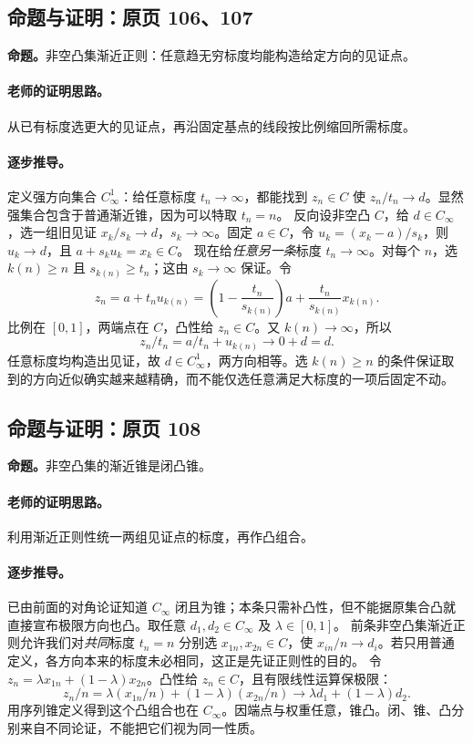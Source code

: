\subsection{命题与证明：原页 106、107}

\textbf{命题。}非空凸集渐近正则：任意趋无穷标度均能构造给定方向的见证点。

\paragraph{老师的证明思路。}从已有标度选更大的见证点，再沿固定基点的线段按比例缩回所需标度。

\paragraph{逐步推导。}
定义强方向集合 $C^1_\infty$：给任意标度 $t_n\to\infty$，都能找到 $z_n\in C$ 使 $z_n/t_n\to d$。显然强集合包含于普通渐近锥，因为可以特取 $t_n=n$。
反向设非空凸 $C$，给 $d\in C_\infty$，选一组旧见证 $x_k/s_k\to d$，$s_k\to\infty$。固定 $a\in C$，令 $u_k=(x_k-a)/s_k$，则 $u_k\to d$，且 $a+s_ku_k=x_k\in C$。
现在给\emph{任意另一条}标度 $t_n\to\infty$。对每个 $n$，选 $k(n)\ge n$ 且 $s_{k(n)}\ge t_n$；这由 $s_k\to\infty$ 保证。令
\[z_n=a+t_nu_{k(n)}=\left(1-\frac{t_n}{s_{k(n)}}\right)a+\frac{t_n}{s_{k(n)}}x_{k(n)}.\]
比例在 $[0,1]$，两端点在 $C$，凸性给 $z_n\in C$。又 $k(n)\to\infty$，所以
\[z_n/t_n=a/t_n+u_{k(n)}\to0+d=d.\]
任意标度均构造出见证，故 $d\in C^1_\infty$，两方向相等。选 $k(n)\ge n$ 的条件保证取到的方向近似确实越来越精确，而不能仅选任意满足大标度的一项后固定不动。


\subsection{命题与证明：原页 108}

\textbf{命题。}非空凸集的渐近锥是闭凸锥。

\paragraph{老师的证明思路。}利用渐近正则性统一两组见证点的标度，再作凸组合。

\paragraph{逐步推导。}
已由前面的对角论证知道 $C_\infty$ 闭且为锥；本条只需补凸性，但不能据原集合凸就直接宣布极限方向也凸。取任意 $d_1,d_2\in C_\infty$ 及 $\lambda\in[0,1]$。
前条非空凸集渐近正则允许我们对\emph{共同}标度 $t_n=n$ 分别选 $x_{1n},x_{2n}\in C$，使 $x_{in}/n\to d_i$。若只用普通定义，各方向本来的标度未必相同，这正是先证正则性的目的。
令 $z_n=\lambda x_{1n}+(1-\lambda)x_{2n}$。凸性给 $z_n\in C$，且有限线性运算保极限：
\[z_n/n=\lambda(x_{1n}/n)+(1-\lambda)(x_{2n}/n)\to\lambda d_1+(1-\lambda)d_2.\]
用序列锥定义得到这个凸组合也在 $C_\infty$。因端点与权重任意，锥凸。闭、锥、凸分别来自不同论证，不能把它们视为同一性质。


